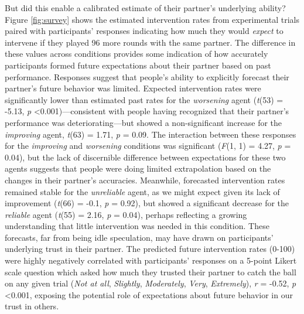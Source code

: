 \documentclass[10pt,letterpaper]{article}
\begin{document}
But did this enable a calibrated estimate of their partner's underlying ability? Figure \ref{fig:survey} shows the estimated intervention rates from experimental trials paired with participants' responses indicating how much they would \textit{expect} to intervene if they played 96 more rounds with the same partner. The difference in these values across conditions provides some indication of how accurately participants formed future expectations about their partner based on past performance. Responses suggest that people's ability to explicitly forecast their partner's future behavior was limited. Expected intervention rates were significantly lower than estimated past rates for the \textit{worsening} agent (\textit{t}(53) = -5.13, \textit{p} \textless{0.001})---consistent with people having recognized that their partner's performance was deteriorating---but showed a non-significant increase for the \textit{improving} agent, \textit{t}(63) = 1.71, \textit{p} = 0.09. The interaction between these responses for the \textit{improving} and \textit{worsening} conditions was significant (\textit{F}(1, 1) = 4.27, \textit{p} = 0.04), but the lack of discernible difference between expectations for these two agents suggests that people were doing limited extrapolation based on the changes in their partner's accuracies. Meanwhile, forecasted intervention rates remained stable for the \textit{unreliable} agent, as we might expect given its lack of improvement (\textit{t}(66) = -0.1, \textit{p} = 0.92), but showed a significant decrease for the \textit{reliable} agent (\textit{t}(55) = 2.16, \textit{p} = 0.04), perhaps reflecting a growing understanding that little intervention was needed in this condition. These forecasts, far from being idle speculation, may have drawn on participants' underlying trust in their partner. The predicted future intervention rates (0-100) were highly negatively correlated with participants' responses on a 5-point Likert scale question which asked how much they trusted their partner to catch the ball on any given trial (\textit{Not at all}, \textit{Slightly}, \textit{Moderately}, \textit{Very}, \textit{Extremely}), \textit{r} = -0.52, \textit{p} \textless{0.001}, exposing the potential role of expectations about future behavior in our trust in others.
\end{document}
